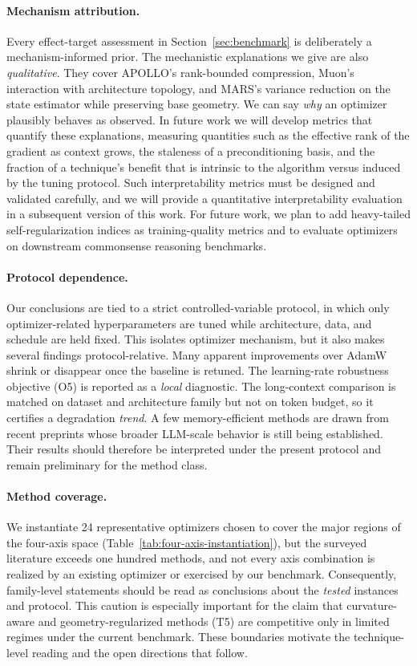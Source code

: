 \paragraph{Mechanism attribution.}
Every effect-target assessment in Section~\ref{sec:benchmark} is deliberately a
mechanism-informed prior. The mechanistic explanations we give are also \emph{qualitative}. They cover
APOLLO's rank-bounded compression, Muon's interaction with architecture topology,
and MARS's variance reduction on the state estimator while preserving base
geometry. We can say \emph{why} an optimizer plausibly behaves as observed. In future work
we will develop metrics that quantify these explanations, measuring quantities
such as the effective
rank of the gradient as context grows, the staleness of a preconditioning basis,
and the fraction of a technique's benefit that is intrinsic to the algorithm
versus
induced by the tuning protocol. Such interpretability metrics must be designed
and validated carefully, and we will provide a quantitative interpretability
evaluation in a subsequent version of this work. For future work, we plan to add
heavy-tailed self-regularization indices as training-quality metrics and to
evaluate optimizers on downstream commonsense reasoning benchmarks.

\paragraph{Protocol dependence.}
Our conclusions are tied to a strict controlled-variable protocol, in which only
optimizer-related hyperparameters are tuned while architecture, data, and
schedule are held fixed. This isolates optimizer mechanism, but it also makes
several findings protocol-relative. Many apparent
improvements over AdamW shrink or disappear once the baseline is retuned. The
learning-rate robustness objective (O5) is reported as a \emph{local} diagnostic.
The long-context comparison is
matched on dataset and architecture family but not on token budget, so it
certifies a degradation \emph{trend}.
A few memory-efficient methods are drawn from recent preprints whose broader
LLM-scale behavior is still being established. Their results should therefore
be interpreted under the present protocol and remain preliminary for the
method class.

\paragraph{Method coverage.}
We instantiate 24 representative optimizers chosen to cover the major regions of
the four-axis space (Table~\ref{tab:four-axis-instantiation}), but the surveyed literature
exceeds one hundred methods, and not every axis combination is realized by an
existing optimizer or exercised by our benchmark. Consequently, family-level statements should be read as conclusions about the
\emph{tested} instances and protocol. This caution is especially important for the claim that
curvature-aware and geometry-regularized methods (T5) are competitive only in
limited regimes under the current benchmark. These boundaries motivate the
technique-level reading and the open directions that follow.

